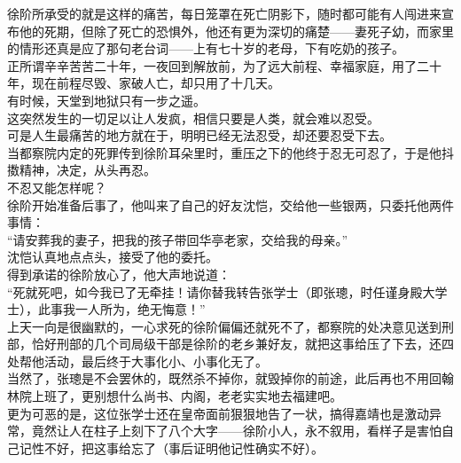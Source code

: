 \begin{multicols}{\theparacolNo}
徐阶所承受的就是这样的痛苦，每日笼罩在死亡阴影下，随时都可能有人闯进来宣布他的死期，但除了死亡的恐惧外，他还有更为深切的痛楚——妻死子幼，而家里的情形还真是应了那句老台词——上有七十岁的老母，下有吃奶的孩子。\\

正所谓辛辛苦苦二十年，一夜回到解放前，为了远大前程、幸福家庭，用了二十年，现在前程尽毁、家破人亡，却只用了十几天。\\

有时候，天堂到地狱只有一步之遥。\\

这突然发生的一切足以让人发疯，相信只要是人类，就会难以忍受。\\

可是人生最痛苦的地方就在于，明明已经无法忍受，却还要忍受下去。\\

当都察院内定的死罪传到徐阶耳朵里时，重压之下的他终于忍无可忍了，于是他抖擞精神，决定，从头再忍。\\

不忍又能怎样呢？\\

徐阶开始准备后事了，他叫来了自己的好友沈恺，交给他一些银两，只委托他两件事情：\\

“请安葬我的妻子，把我的孩子带回华亭老家，交给我的母亲。”\\

沈恺认真地点点头，接受了他的委托。\\

得到承诺的徐阶放心了，他大声地说道：\\

“死就死吧，如今我已了无牵挂！请你替我转告张学士（即张璁，时任谨身殿大学士），此事我一人所为，绝无悔意！”\\

上天一向是很幽默的，一心求死的徐阶偏偏还就死不了，都察院的处决意见送到刑部，恰好刑部的几个司局级干部是徐阶的老乡兼好友，就把这事给压了下去，还四处帮他活动，最后终于大事化小、小事化无了。\\

当然了，张璁是不会罢休的，既然杀不掉你，就毁掉你的前途，此后再也不用回翰林院上班了，更别想什么尚书、内阁，老老实实地去福建吧。\\

更为可恶的是，这位张学士还在皇帝面前狠狠地告了一状，搞得嘉靖也是激动异常，竟然让人在柱子上刻下了八个大字——徐阶小人，永不叙用，看样子是害怕自己记性不好，把这事给忘了（事后证明他记性确实不好）。\\


\end{multicols}
